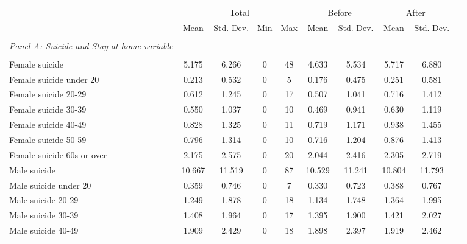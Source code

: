 \begin{tabular}{l*{9}{c}} \toprule
                    &\multicolumn{4}{c}{Total}                          &\multicolumn{2}{c}{Before}&\multicolumn{2}{c}{After}\\\cmidrule(lr){2-5}\cmidrule(lr){6-7}\cmidrule(lr){8-9}
                    &        Mean&   Std. Dev.&         Min&         Max&        Mean&   Std. Dev.&        Mean&   Std. Dev.\\
\hline \\ \multicolumn{1}{l}{\textit{Panel A: Suicide and Stay-at-home variable}} \\\\[-1ex]
Female suicide      &       5.175&       6.266&           0&          48&       4.633&       5.534&       5.717&       6.880\\
Female suicide under 20&       0.213&       0.532&           0&           5&       0.176&       0.475&       0.251&       0.581\\
Female suicide 20-29&       0.612&       1.245&           0&          17&       0.507&       1.041&       0.716&       1.412\\
Female suicide 30-39&       0.550&       1.037&           0&          10&       0.469&       0.941&       0.630&       1.119\\
Female suicide 40-49&       0.828&       1.325&           0&          11&       0.719&       1.171&       0.938&       1.455\\
Female suicide 50-59&       0.796&       1.314&           0&          10&       0.716&       1.204&       0.876&       1.413\\
Female suicide 60s or over&       2.175&       2.575&           0&          20&       2.044&       2.416&       2.305&       2.719\\
Male suicide        &      10.667&      11.519&           0&          87&      10.529&      11.241&      10.804&      11.793\\
Male suicide under 20&       0.359&       0.746&           0&           7&       0.330&       0.723&       0.388&       0.767\\
Male suicide 20-29  &       1.249&       1.878&           0&          18&       1.134&       1.748&       1.364&       1.995\\
Male suicide 30-39  &       1.408&       1.964&           0&          17&       1.395&       1.900&       1.421&       2.027\\
Male suicide 40-49  &       1.909&       2.429&           0&          18&       1.898&       2.397&       1.919&       2.462\\

\end{tabular}
